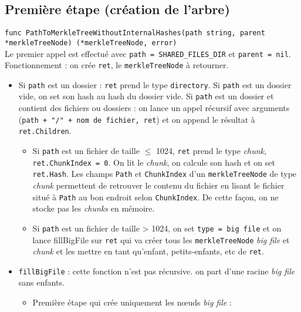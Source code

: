 \subsection{Première étape (création de l'arbre)}
\footnotesize\texttt{func PathToMerkleTreeWithoutInternalHashes(path string, parent *merkleTreeNode) (*merkleTreeNode, error)}\\ \normalsize
Le premier appel est effectué avec \texttt{path = SHARED_FILES_DIR} et \texttt{parent = nil}.
\\Fonctionnement : on crée \texttt{ret}, le \texttt{merkleTreeNode} à retourner.
\begin{itemize}
    \item Si \texttt{path} est un dossier :
        \texttt{ret} prend le type \texttt{directory}.
        Si \texttt{path} est un dossier vide, on set son hash au hash du dossier vide.
        Si \texttt{path} est un dossier et contient des fichiers ou dossiers : on lance un appel récursif avec arguments (\texttt{path + "/" + nom de fichier, ret}) et on append le résultat à \texttt{ret.Children}.
        \begin{itemize}
            \item Si \texttt{path} est un fichier de taille $\leqslant$ 1024, \texttt{ret} prend le type \textit{chunk}, \texttt{ret.ChunkIndex = 0}. On lit le \textit{chunk}, on calcule son hash et on set \texttt{ret.Hash}. Les champs \texttt{Path} et \texttt{ChunkIndex} d'un \texttt{merkleTreeNode} de type \textit{chunk} permettent de retrouver le contenu du fichier en lisant le fichier situé à \texttt{Path} au bon endroit selon \texttt{ChunkIndex}. De cette façon, on ne stocke pas les \textit{chunks} en mémoire.
            \item Si \texttt{path} est un fichier de taille > 1024, on set \texttt{type = big file} et on lance fillBigFile sur \texttt{ret} qui va créer tous les \texttt{merkleTreeNode} \textit{big file} et \textit{chunk} et les mettre en tant qu'enfant, petits-enfants, etc de \texttt{ret}.
        \end{itemize}
    \item \texttt{fillBigFile} : cette fonction n'est pas récursive. on part d'une racine \textit{big file} sans enfants.
        \begin{itemize}
            \item Première étape qui crée uniquement les nœuds \textit{big file} :

\end{itemize}
\end{itemize}
